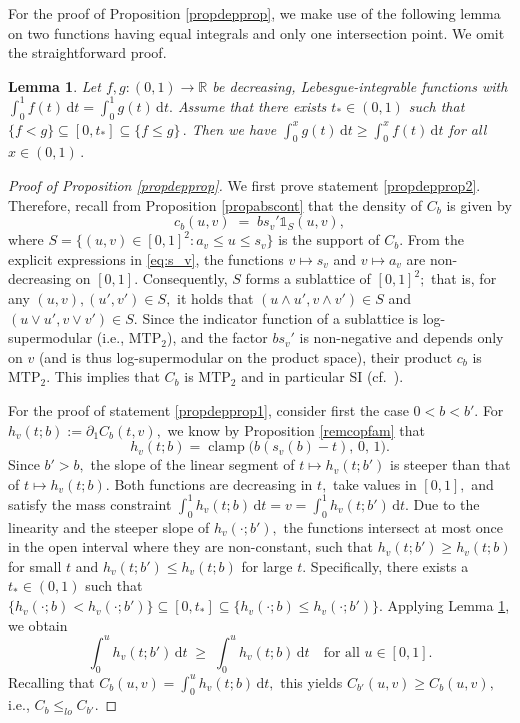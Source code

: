 \documentclass{article}
\theoremstyle{plain}
\newtheorem{lemma}{Lemma}
\theoremstyle{definition}
\newcommand{\de}{\mathrm{\,d}}
\newcommand{\R}{\mathbb{R}}
\newcommand{\ind}{\mathds{1}}
\begin{document}
For the proof of Proposition \ref{propdepprop}, we make use of the following lemma on two functions having equal integrals and only one intersection point. We omit the straightforward proof.

\begin{lemma}\label{lemsignchange}
    Let \(f,g\colon (0,1)\to \R\) be decreasing, Lebesgue-integrable functions with \(\int_0^1 f(t) \de t = \int_0^1 g(t) \de t.\) Assume that there exists \(t_*\in (0,1)\) such that \(\{f < g\} \subseteq [0,t_*] \subseteq \{f\leq g\}\,.\) Then we have \(\int_0^x g(t) \de t \geq \int_0^x f(t) \de t\) for all \(x\in (0,1)\,.\)
\end{lemma}


\begin{proof}[Proof of Proposition \ref{propdepprop}]

We first prove statement \ref{propdepprop2}. Therefore, recall from Proposition \ref{propabscont} that the density of $C_b$ is given by
    \[
        c_b(u,v) \;=\; b s_v' \ind_S(u,v),
    \]
    where $S = \{(u,v) \in [0,1]^2 : a_v \leq  u \leq s_v\}$ is the support of \(C_b\).
    From the explicit expressions in \eqref{eq:s_v}, the functions $v \mapsto s_v$ and $v \mapsto a_v$ are non-decreasing on $[0,1].$
    Consequently, $S$ forms a sublattice of $[0,1]^2;$ that is, for any $(u,v), (u',v') \in S,$ it holds that $(u\wedge u', v\wedge v') \in S$ and $(u\vee u', v\vee v') \in S.$
    Since the indicator function of a sublattice is log-supermodular (i.e., $\mathrm{MTP}_2$), and the factor $b s_v'$ is non-negative and depends only on $v$ (and is thus log-supermodular on the product space), their product $c_b$ is $\mathrm{MTP}_2.$
    This implies that $C_b$ is $\mathrm{MTP}_2$ and in particular SI (cf.~\cite[page 146]{Mueller-Stoyan-2002}).

For the proof of statement \ref{propdepprop1}, consider first the case $0 < b < b'.$
    For $h_v(t; b) := \partial_1 C_b(t,v),$ we know by Proposition \ref{remcopfam} that
    \[
        h_v(t; b) = \operatorname{clamp}\bigl(b(s_v(b)-t),\, 0,\, 1\bigr).
    \]
    Since $b' > b,$ the slope of the linear segment of $t \mapsto h_v(t; b')$ is steeper than that of $t \mapsto h_v(t; b).$
    Both functions are decreasing in $t,$ take values in $[0,1],$ and satisfy the mass constraint $\int_0^1 h_v(t; b) \de t = v = \int_0^1 h_v(t; b') \de t.$
    Due to the linearity and the steeper slope of $h_v(\cdot; b'),$ the functions intersect at most once in the open interval where they are non-constant, such that $h_v(t; b') \ge h_v(t; b)$ for small $t$ and $h_v(t; b') \le h_v(t; b)$ for large $t.$
    Specifically, there exists a $t_* \in (0,1)$ such that $\{h_v(\cdot; b) < h_v(\cdot; b')\} \subseteq [0, t_*] \subseteq \{h_v(\cdot; b) \le h_v(\cdot; b')\}.$
    Applying Lemma \ref{lemsignchange}, we obtain
    \[
        \int_0^u h_v(t; b') \de t \;\ge\; \int_0^u h_v(t; b) \de t \quad \text{for all } u \in [0,1].
    \]
    Recalling that $C_b(u,v) = \int_0^u h_v(t; b) \de t,$ this yields $C_{b'}(u,v) \ge C_b(u,v),$ i.e., $C_b \le_{lo} C_{b'}.$


\end{proof}
\end{document}
